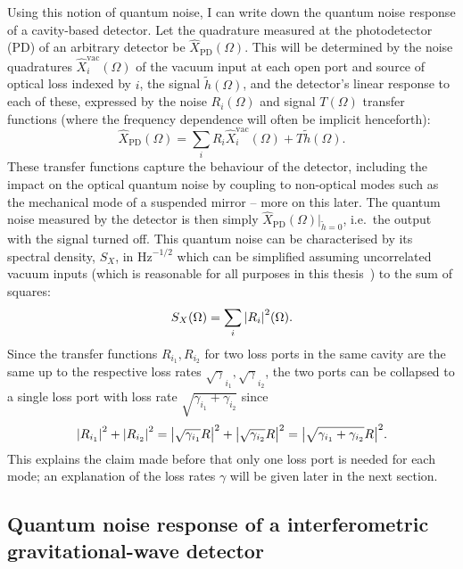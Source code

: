 Using this notion of quantum noise, I can write down the quantum noise response of a cavity-based detector. %
Let the quadrature measured at the photodetector (PD) of an arbitrary detector be $\hat{X}_\text{PD}(\Omega)$. This will be determined by the noise quadratures $\hat{X}_i^\text{vac}(\Omega)$ of the vacuum input at each open port and source of optical loss indexed by $i$, the signal $\tilde{h}(\Omega)$, and the detector's linear response to each of these, expressed by the noise $R_i(\Omega)$ and signal $T(\Omega)$ transfer functions (where the frequency dependence will often be implicit henceforth): $$\hat X_\text{PD}(\Omega)=\sum_i R_i \hat X_i^\text{vac}(\Omega) + T \tilde h(\Omega).$$
These transfer functions capture the behaviour of the detector, including the impact on the optical quantum noise by coupling to non-optical modes such as the mechanical mode of a suspended mirror -- more on this later. 
The quantum noise measured by the detector is then simply $\hat X_\text{PD}(\Omega)|_{\tilde h=0}$, i.e.\ the output with the signal turned off. This quantum noise can be characterised by its spectral density, $S_X$, in $\text{Hz}^{-1/2}$ which can be simplified assuming uncorrelated vacuum inputs (which is reasonable for all purposes in this thesis~\cite{}) to the sum of squares: $$S_X(\Omega)=\sum_i \abs{R_i}^2(\Omega).$$ 
Since the transfer functions $R_{i_1}, R_{i_2}$ for two loss ports in the same cavity are the same up to the respective loss rates $\sqrt\gamma_{i_1}, \sqrt\gamma_{i_2}$, the two ports can be collapsed to a single loss port with loss rate $\sqrt{\gamma_{i_1}+\gamma_{i_2}}$ since $$\abs{R_{i_1}}^2+\abs{R_{i_2}}^2=\abs{\sqrt{\gamma_{i_1}}R}^2+\abs{\sqrt{\gamma_{i_2}}R}^2=\abs{\sqrt{\gamma_{i_1}+\gamma_{i_2}}R}^2.$$ This explains the claim made before that only one loss port is needed for each mode; an explanation of the loss rates $\gamma$ will be given later in the next section.



\subsection{Quantum noise response of a interferometric gravitational-wave detector}

